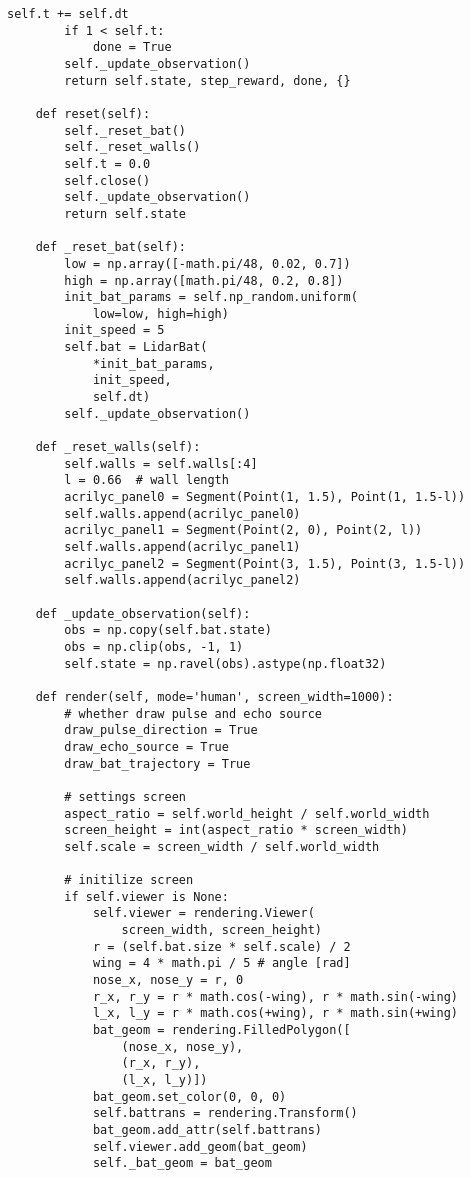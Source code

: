 \documentclass[../appendix]{subfiles}
\begin{document}
\begin{lstlisting}[frame=single]
        self.t += self.dt
        if 1 < self.t:
            done = True
        self._update_observation()
        return self.state, step_reward, done, {}

    def reset(self):
        self._reset_bat()
        self._reset_walls()
        self.t = 0.0
        self.close()
        self._update_observation()
        return self.state

    def _reset_bat(self):
        low = np.array([-math.pi/48, 0.02, 0.7])
        high = np.array([math.pi/48, 0.2, 0.8])
        init_bat_params = self.np_random.uniform(
            low=low, high=high)
        init_speed = 5
        self.bat = LidarBat(
            *init_bat_params, 
            init_speed, 
            self.dt)
        self._update_observation()

    def _reset_walls(self):
        self.walls = self.walls[:4]
        l = 0.66  # wall length
        acrilyc_panel0 = Segment(Point(1, 1.5), Point(1, 1.5-l))
        self.walls.append(acrilyc_panel0)
        acrilyc_panel1 = Segment(Point(2, 0), Point(2, l))
        self.walls.append(acrilyc_panel1)
        acrilyc_panel2 = Segment(Point(3, 1.5), Point(3, 1.5-l))
        self.walls.append(acrilyc_panel2)
    
    def _update_observation(self):
        obs = np.copy(self.bat.state)
        obs = np.clip(obs, -1, 1)
        self.state = np.ravel(obs).astype(np.float32)

    def render(self, mode='human', screen_width=1000):
        # whether draw pulse and echo source
        draw_pulse_direction = True
        draw_echo_source = True
        draw_bat_trajectory = True

        # settings screen
        aspect_ratio = self.world_height / self.world_width
        screen_height = int(aspect_ratio * screen_width)
        self.scale = screen_width / self.world_width

        # initilize screen
        if self.viewer is None:
            self.viewer = rendering.Viewer(
                screen_width, screen_height)
            r = (self.bat.size * self.scale) / 2
            wing = 4 * math.pi / 5 # angle [rad]
            nose_x, nose_y = r, 0
            r_x, r_y = r * math.cos(-wing), r * math.sin(-wing)
            l_x, l_y = r * math.cos(+wing), r * math.sin(+wing)
            bat_geom = rendering.FilledPolygon([
                (nose_x, nose_y),
                (r_x, r_y),
                (l_x, l_y)])
            bat_geom.set_color(0, 0, 0)
            self.battrans = rendering.Transform()
            bat_geom.add_attr(self.battrans)
            self.viewer.add_geom(bat_geom)
            self._bat_geom = bat_geom


\end{lstlisting}
\end{document}
